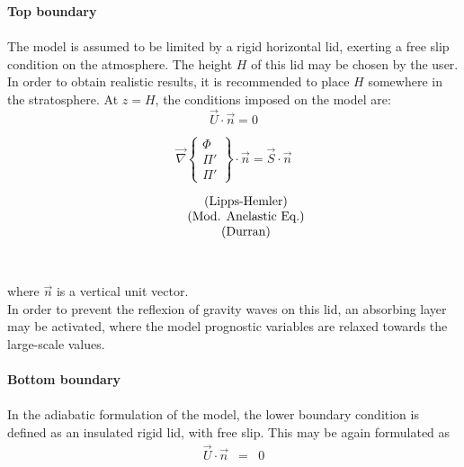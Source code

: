 {\bf Top boundary}
\\
\\
The model is assumed to be limited by a rigid horizontal lid, exerting a
free slip condition on the atmosphere. The height $H$ of this lid may be
chosen by the user. In order to obtain realistic results, it is recommended
to place $H$ somewhere in the stratosphere. At $z=H$, the conditions imposed
on the model are:
\begin{equation}
\vec{U}\cdot\vec{n} = 0
\end{equation}
%
\parbox{2cm}{
\quad
}
\hfill
\parbox{5cm}{
\begin{displaymath}
\vec{\nabla} \left\{
\begin{array}{c}
\Phi \\
\Pi '  \\
\Pi '
\end{array}
\right\} \cdot \vec{n} = \vec{S}\cdot \vec{n}
\end{displaymath}
}
\hfill
\parbox{5cm}{
\begin{displaymath}
\begin{array}{c@{\quad}c}
\quad &\mbox{(Lipps-Hemler)} \\
\quad &\mbox{(Mod. Anelastic Eq.)} \\
\quad &\mbox{(Durran)}
\end{array}
\end{displaymath}
}
\hfill
\parbox{1cm}{
\begin{eqnarray}
 \\   \\
\end{eqnarray}
}
%

where $\vec{n}$ is a vertical unit vector. \\

In order to prevent the reflexion of gravity waves on this lid, an absorbing
layer may be activated, where the model prognostic variables are relaxed
towards the large-scale values.
\\
\\
{\bf Bottom boundary}
\\
\\
In the adiabatic formulation of the model, the lower boundary condition is
defined as an insulated rigid lid, with free slip. This may be again
formulated as
\begin{eqnarray}
\vec{U}\cdot\vec{n}&=&0  \\
\end{eqnarray}

